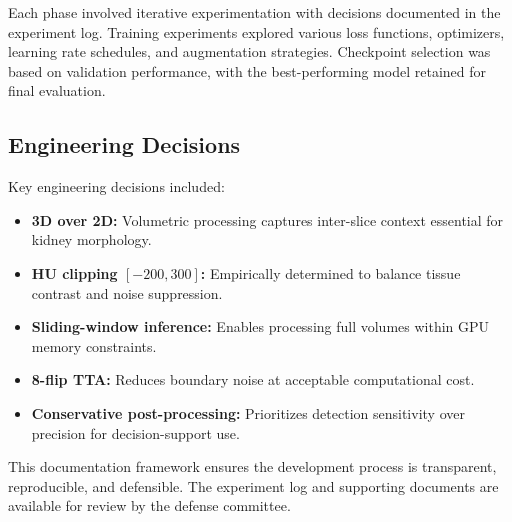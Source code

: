 Each phase involved iterative experimentation with decisions documented in the experiment log. Training experiments explored various loss functions, optimizers, learning rate schedules, and augmentation strategies. Checkpoint selection was based on validation performance, with the best-performing model retained for final evaluation.

\subsection{Engineering Decisions}

Key engineering decisions included:
\begin{itemize}
    \item \textbf{3D over 2D:} Volumetric processing captures inter-slice context essential for kidney morphology.
    \item \textbf{HU clipping $[-200, 300]$:} Empirically determined to balance tissue contrast and noise suppression.
    \item \textbf{Sliding-window inference:} Enables processing full volumes within GPU memory constraints.
    \item \textbf{8-flip TTA:} Reduces boundary noise at acceptable computational cost.
    \item \textbf{Conservative post-processing:} Prioritizes detection sensitivity over precision for decision-support use.
\end{itemize}

This documentation framework ensures the development process is transparent, reproducible, and defensible. The experiment log and supporting documents are available for review by the defense committee.
